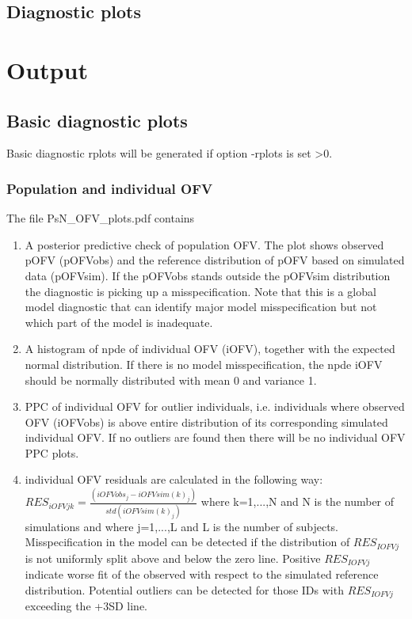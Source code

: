 \subsection{Diagnostic plots}
\newcommand{\rplotsconditions}{
See section Output, subsections Basic and Extended diagnostic plots,
for descriptions of the default simeval plots.
The default simeval template 
requires that libraries gridExtra, PEIP and PerformanceAnalytics are installed.
If the conditions are not fulfilled then no pdf will be generated,
see the .Rout file in the main run directory for error messages.}



\section{Output}

\subsection{Basic diagnostic plots}
Basic diagnostic rplots will be generated 
if option -rplots is set >0.

\subsubsection{Population and individual OFV}
\noindent The file PsN\_OFV\_plots.pdf contains
\begin{enumerate}
\item A posterior predictive check of population OFV. The plot shows
observed pOFV (pOFVobs) and the reference
distribution of pOFV based on simulated data (pOFVsim). If the pOFVobs stands outside the pOFVsim distribution the diagnostic is picking up a misspecification. Note that 
this is a global model diagnostic
that can identify major model misspecification but not which part of the model
is inadequate.
\item A histogram of npde of individual OFV (iOFV), together with the expected
normal distribution. If there is no model misspecification, the npde iOFV should
be normally distributed with mean 0 and variance 1.
\item PPC of individual OFV for outlier individuals, i.e.
individuals where observed OFV (iOFVobs) is above entire
distribution of its corresponding simulated individual OFV. If no outliers are found then there will be no individual OFV PPC plots.
\item individual OFV residuals are calculated in the following way:
$RES_{iOFVjk}=\frac{(iOFVobs_{j} - iOFVsim(k)_{j})}{std(iOFVsim(k)_{j})}$
where k=1,...,N and N is the number of simulations and where j=1,...,L and L is the number of subjects. 
Misspecification in the model can be detected if the distribution of $RES_{IOFVj}$ is not uniformly split above and below the zero line. Positive $RES_{IOFVj}$ indicate worse fit of the observed with respect to the simulated reference distribution. Potential outliers can be detected for those IDs with $RES_{IOFVj}$ exceeding the +3SD line. 
\end{enumerate}

